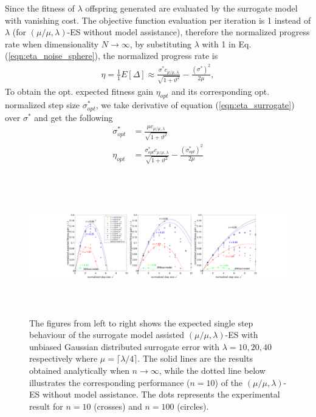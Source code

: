 Since the fitness of $\lambda$ offspring generated are evaluated by the surrogate model with vanishing cost. The objective function evaluation per iteration is 1 instead of $\lambda$ (for $(\mu/\mu,\lambda)$-ES without model assistance), therefore the normalized progress rate when dimensionality $N \rightarrow \infty$, by substituting $\lambda$ with 1 in Eq. (\ref{eqn:eta_noise_sphere}), the normalized progress rate is 
\begin{align}\label{eqn:eta_surrogate}{}
\eta = \frac{1}{1}E[ \Delta] \approx  \frac{\sigma^* c_{\mu / \mu, \lambda}}{\sqrt {1+ \vartheta^2}} - \frac{(\sigma^*)^2}{2 \mu} ,
\end{align}
To obtain the opt. expected fitness gain $\eta_{opt}$ and its corresponding opt. normalized step size $\sigma^*_{opt}$, we take derivative of equation (\ref{eqn:eta_surrogate}) over $\sigma^*$ and get the following 
\begin{align}\label{eqn:opt_surrogate}
\sigma^*_{opt} &= \frac{ \mu c_{\mu / \mu, \lambda}}{\sqrt {1+ \vartheta^2}}\\
\eta_{opt} &= \frac{\sigma^*_{opt} c_{\mu / \mu, \lambda}}{\sqrt {1+ \vartheta^2}} - \frac{(\sigma^*_{opt})^2}{2 \mu} 
\end{align}

\begin{center}
\begin{figure}
\includegraphics[height=2.4in, width=6.1in]{expectedFitGain_v1}
\caption{The figures from left to right shows the expected single step behaviour of the surrogate model assisted $(\mu/\mu,\lambda)$-ES with unbiased Gaussian distributed surrogate error with $\lambda=10,20,40$ respectively where $\mu = \lceil \lambda/4 \rceil$. The solid lines are the results obtained analytically when $n \rightarrow \infty$, while the dotted line below illustrates the corresponding performance ($n=10$) of the $(\mu/\mu,\lambda)$-ES without model assistance. The dots represents the experimental result for $n=10$ (crosses) and $n=100$ (circles).}
\label{fig:expectedFitGain}
\end{figure}
\end{center}

